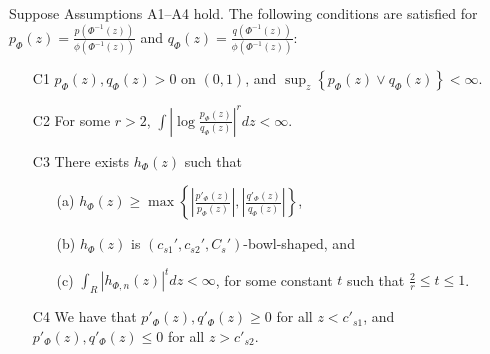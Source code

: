 \documentclass{article}
\begin{document}
\begin{proposition}
\label{prop:transformation2}
Suppose Assumptions A1--A4 hold.
The following conditions are satisfied for $p_\Phi(z) = \frac{p(\Phi^{-1}(z))}{\phi(\Phi^{-1}(z))}$ and $q_\Phi(z) = \frac{q(\Phi^{-1}(z))}{\phi(\Phi^{-1}(z))}$:
\begin{enumerate}
\item[C1] $p_{\Phi}(z), q_{\Phi}(z) > 0$ on $(0, 1)$, and $\sup_z \left\{p_{\Phi}(z) \vee q_{\Phi}(z)\right\} < \infty$. 
\item[C2] For some $r > 2$, $\int \left| \log \frac{p_\Phi(z)}{q_\Phi(z)} \right|^r dz < \infty$.
\item[C3]  There exists $h_{\Phi}(z)$ such that
\begin{itemize}
\item[(a)] $h_{\Phi}(z) \geq \max \left\{  \left|\frac{p'_\Phi(z)}{p_\Phi(z)} \right|, 
 \left|\frac{q'_\Phi(z)}{q_\Phi(z)}\right|  \right\}$,
\item[(b)] $h_{\Phi}(z)$ is $(c_{s1}', c_{s2}', C_s')$-bowl-shaped, and
\item[(c)] $\int_R |h_{\Phi,n}(z)|^t dz < \infty$, for some constant $t$ such that $\frac{2}{r} \le t \le 1$.
\end{itemize} 
\item[C4]  We have that $p'_\Phi(z), q'_\Phi(z) \geq 0$ for all $z < c'_{s1}$, and $p'_\Phi(z), q'_\Phi(z) \leq 0$ for all $z > c'_{s2}$. 
\end{enumerate}

\end{proposition}
\end{document}
